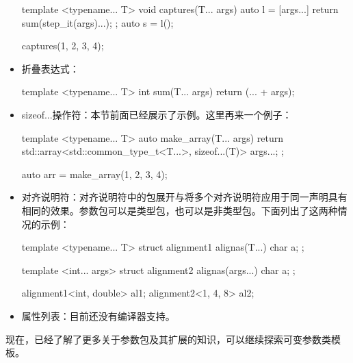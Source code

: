 \begin{itemize}
\begin{cppcode}
template <typename... T>
void captures(T... args)
{
	auto l = [args...]{
		        return sum(step_it(args)...); };
	auto s = l();
}

captures(1, 2, 3, 4);
\end{cppcode}
  \item 折叠表达式：

\begin{cppcode}
template <typename... T>
int sum(T... args)
{
	return (... + args);
}
\end{cppcode}
  \item sizeof...操作符：本节前面已经展示了示例。这里再来一个例子：

\begin{cppcode}
template <typename... T>
auto make_array(T... args)
{
	return std::array<std::common_type_t<T...>,
	                  sizeof...(T)> {args...};
};

auto arr = make_array(1, 2, 3, 4);
\end{cppcode}
  \item 对齐说明符：对齐说明符中的包展开与将多个对齐说明符应用于同一声明具有相同的效果。参数包可以是类型包，也可以是非类型包。下面列出了这两种情况的示例：

\begin{cppcode}
template <typename... T>
struct alignment1
{
	alignas(T...) char a;
};

template <int... args>
struct alignment2
{
	alignas(args...) char a;
};

alignment1<int, double> al1;
alignment2<1, 4, 8> al2;
\end{cppcode}
  \item 属性列表：目前还没有编译器支持。
\end{itemize}

现在，已经了解了更多关于参数包及其扩展的知识，可以继续探索可变参数类模板。








